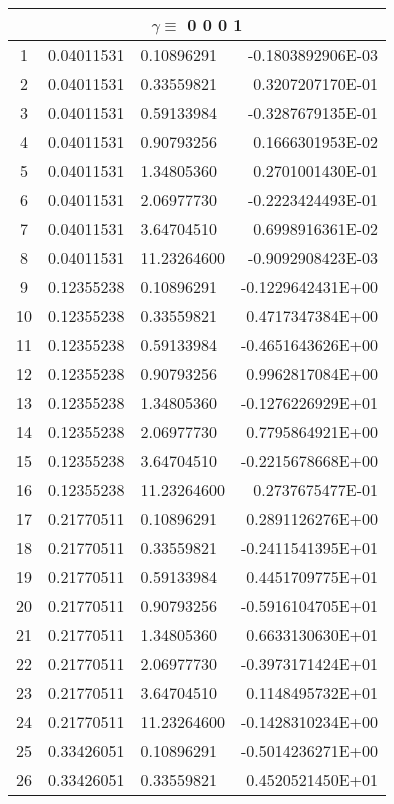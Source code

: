 \begin{longtable}{@{\extracolsep{\fill}}cllr@{}}
\midrule
\multicolumn{4}{c}{ $\gamma \equiv $  0 0 0 1} \\
\midrule
1  &  0.04011531  &  0.10896291  &  -0.1803892906E-03 \\
2  &  0.04011531  &  0.33559821  &   0.3207207170E-01 \\
3  &  0.04011531  &  0.59133984  &  -0.3287679135E-01 \\
4  &  0.04011531  &  0.90793256  &   0.1666301953E-02 \\
5  &  0.04011531  &  1.34805360  &   0.2701001430E-01 \\
6  &  0.04011531  &  2.06977730  &  -0.2223424493E-01 \\
7  &  0.04011531  &  3.64704510  &   0.6998916361E-02 \\
8  &  0.04011531  &  11.23264600  &  -0.9092908423E-03 \\
9  &  0.12355238  &  0.10896291  &  -0.1229642431E+00 \\
10  &  0.12355238  &  0.33559821  &   0.4717347384E+00 \\
11  &  0.12355238  &  0.59133984  &  -0.4651643626E+00 \\
12  &  0.12355238  &  0.90793256  &   0.9962817084E+00 \\
13  &  0.12355238  &  1.34805360  &  -0.1276226929E+01 \\
14  &  0.12355238  &  2.06977730  &   0.7795864921E+00 \\
15  &  0.12355238  &  3.64704510  &  -0.2215678668E+00 \\
16  &  0.12355238  &  11.23264600  &   0.2737675477E-01 \\
17  &  0.21770511  &  0.10896291  &   0.2891126276E+00 \\
18  &  0.21770511  &  0.33559821  &  -0.2411541395E+01 \\
19  &  0.21770511  &  0.59133984  &   0.4451709775E+01 \\
20  &  0.21770511  &  0.90793256  &  -0.5916104705E+01 \\
21  &  0.21770511  &  1.34805360  &   0.6633130630E+01 \\
22  &  0.21770511  &  2.06977730  &  -0.3973171424E+01 \\
23  &  0.21770511  &  3.64704510  &   0.1148495732E+01 \\
24  &  0.21770511  &  11.23264600  &  -0.1428310234E+00 \\
25  &  0.33426051  &  0.10896291  &  -0.5014236271E+00 \\
26  &  0.33426051  &  0.33559821  &   0.4520521450E+01 \\

\end{longtable}
